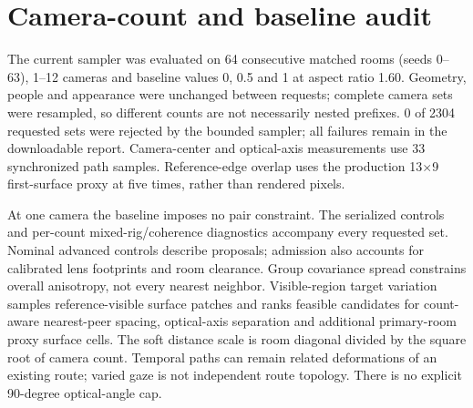 \section{Camera-count and baseline audit}
The current sampler was evaluated on 64 consecutive matched rooms (seeds 0--63), 1--12 cameras and baseline values 0, 0.5 and 1 at aspect ratio 1.60. Geometry, people and appearance were unchanged between requests; complete camera sets were resampled, so different counts are not necessarily nested prefixes. 0 of 2304 requested sets were rejected by the bounded sampler; all failures remain in the downloadable report. Camera-center and optical-axis measurements use 33 synchronized path samples. Reference-edge overlap uses the production 13$\times$9 first-surface proxy at five times, rather than rendered pixels.

At one camera the baseline imposes no pair constraint. The serialized controls and per-count mixed-rig/coherence diagnostics accompany every requested set. Nominal advanced controls describe proposals; admission also accounts for calibrated lens footprints and room clearance. Group covariance spread constrains overall anisotropy, not every nearest neighbor. Visible-region target variation samples reference-visible surface patches and ranks feasible candidates for count-aware nearest-peer spacing, optical-axis separation and additional primary-room proxy surface cells. The soft distance scale is room diagonal divided by the square root of camera count. Temporal paths can remain related deformations of an existing route; varied gaze is not independent route topology. There is no explicit 90-degree optical-angle cap.

